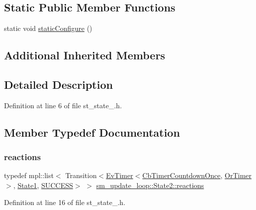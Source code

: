 \subsection*{Static Public Member Functions}
\begin{DoxyCompactItemize}
\item 
static void \hyperlink{structsm__update__loop_1_1State2_a1def7d74eb295ef6fdfdd122affa921d}{static\+Configure} ()
\end{DoxyCompactItemize}
\subsection*{Additional Inherited Members}


\subsection{Detailed Description}


Definition at line 6 of file st\+\_\+state\+\_.\+h.



\subsection{Member Typedef Documentation}
\mbox{\label{structsm__update__loop_1_1State2_a568e8e1054b11a61f72133866608b392}} 
\subsubsection{\texorpdfstring{reactions}{reactions}}
{\footnotesize\ttfamily typedef mpl\+::list$<$ Transition$<$\hyperlink{structcl__ros__timer_1_1EvTimer}{Ev\+Timer}$<$\hyperlink{classcl__ros__timer_1_1CbTimerCountdownOnce}{Cb\+Timer\+Countdown\+Once}, \hyperlink{classsm__update__loop_1_1OrTimer}{Or\+Timer}$>$, \hyperlink{structsm__update__loop_1_1State1}{State1}, \hyperlink{structsmacc_1_1default__transition__tags_1_1SUCCESS}{S\+U\+C\+C\+E\+SS}$>$ $>$ \hyperlink{structsm__update__loop_1_1State2_a568e8e1054b11a61f72133866608b392}{sm\+\_\+update\+\_\+loop\+::\+State2\+::reactions}}



Definition at line 16 of file st\+\_\+state\+\_.\+h.



